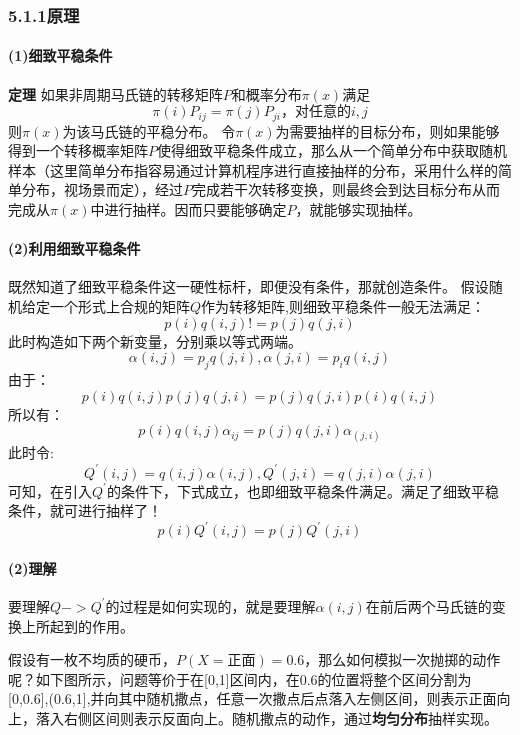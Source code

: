 \documentclass[]{article}
\let\oldparagraph\paragraph
\renewcommand{\paragraph}[1]{\oldparagraph{#1}\mbox{}}
\begin{document}
\subsubsection{5.1.1原理}

\paragraph{(1)细致平稳条件}

\textbf{定理} 如果非周期马氏链的转移矩阵\(P\)和概率分布\(\pi(x)\)满足 \[
\pi(i) P_{ij} = \pi(j) P_{ji}，对任意的i,j
\] 则\(\pi(x)\)为该马氏链的平稳分布。
令\(\pi(x)\)为需要抽样的目标分布，则如果能够得到一个转移概率矩阵\(P\)使得细致平稳条件成立，那么从一个简单分布中获取随机样本（这里简单分布指容易通过计算机程序进行直接抽样的分布，采用什么样的简单分布，视场景而定），经过\(P\)完成若干次转移变换，则最终会到达目标分布从而完成从\(\pi(x)\)中进行抽样。因而只要能够确定\(P\)，就能够实现抽样。

\paragraph{(2)利用细致平稳条件}

既然知道了细致平稳条件这一硬性标杆，即便没有条件，那就创造条件。
假设随机给定一个形式上合规的矩阵\(Q\)作为转移矩阵,则细致平稳条件一般无法满足：
\[
p(i)q(i,j)!=p(j)q(j,i)
\] 此时构造如下两个新变量，分别乘以等式两端。 \[
\alpha(i,j)=p_jq(j,i), \alpha(j,i)=p_iq(i,j)
\] 由于： \[
p(i)q(i,j)p(j)q(j,i)=p(j)q(j,i)p(i)q(i,j) 
\] 所以有： \[
p(i)q(i,j)\alpha_{ij}=p(j)q(j,i)\alpha_(j,i) 
\] 此时令: \[
Q^\prime(i,j) = q(i,j)\alpha(i,j), Q^\prime(j,i) = q(j,i)\alpha(j,i)
\]
可知，在引入\(Q^\prime\)的条件下，下式成立，也即细致平稳条件满足。满足了细致平稳条件，就可进行抽样了！
\[
p(i)Q^\prime(i,j)=p(j)Q^\prime(j,i)
\]

\paragraph{(2)理解}

要理解\(Q -> Q^\prime\)的过程是如何实现的，就是要理解\(\alpha(i,j)\)在前后两个马氏链的变换上所起到的作用。

假设有一枚不均质的硬币，\(P(X=正面)=0.6\)，那么如何模拟一次抛掷的动作呢？如下图所示，问题等价于在{[}0,1{]}区间内，在0.6的位置将整个区间分割为{[}0,0.6{]},(0.6,1{]},并向其中随机撒点，任意一次撒点后点落入左侧区间，则表示正面向上，落入右侧区间则表示反面向上。随机撒点的动作，通过\textbf{均匀分布}抽样实现。
\end{document}
